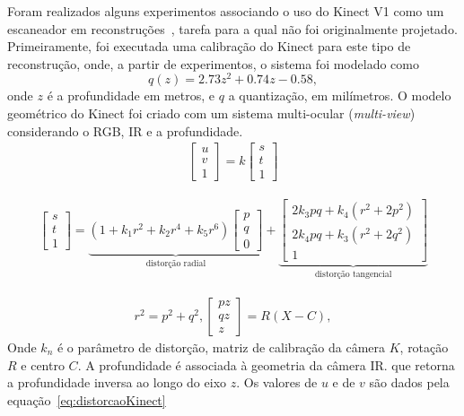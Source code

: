 Foram realizados alguns experimentos associando o uso do Kinect V1 como um
escaneador em reconstruções~\cite{smisek20133d}, tarefa para a qual não foi
originalmente projetado. Primeiramente, foi executada uma calibração do
Kinect para este tipo de reconstrução, onde, a partir de experimentos, o sistema
foi modelado como
\begin{equation}
\label{eq:kinectCalibracao}
q(z)=2.73z^{2}+0.74z-0.58,
\end{equation}
onde $z$ é a profundidade em metros, e $q$ a quantização, em milímetros.
O modelo geométrico do Kinect foi criado com um sistema multi-ocular
(\emph{multi-view}) considerando o RGB, IR e a profundidade.
\begin{gather} 
\label{eq:matrix}
\begin{bmatrix}
u\\
v\\
1
\end{bmatrix} 
= k
\begin{bmatrix}
s\\
t\\
1
\end{bmatrix}
\end{gather}

\begin{gather} 
\begin{bmatrix}
s\\
t\\
1
\end{bmatrix} 
= 
\underbrace{(1 + k_1r^2 + k_2r^4 + k_5r^6) 
\begin{bmatrix}
p\\
q\\
0
\end{bmatrix} }_{\text{distorção radial}} 
+
\underbrace{
\begin{bmatrix}
2k_3pq+k_4(r^2+2p^2)\\
2k_4pq+k_3(r^2+2q^2)\\
1
\end{bmatrix} }_{\text{distorção tangencial}}
\label{eq:distorcaoKinect}
\end{gather}

\begin{gather}
r^2 = p^2+q^2, 
\begin{bmatrix}
pz\\ 
qz\\ 
z
\end{bmatrix} = R(X-C),
\label{eq:relacaoKinect}
\end{gather}
Onde $k_n$ é o parâmetro de distorção, matriz de calibração da câmera $K$, rotação $R$ e centro $C$.
A profundidade é associada à geometria da câmera IR. que retorna a profundidade inversa ao longo do eixo $z$.
Os valores de $u$ e de $v$ são dados pela equação~\ref{eq:distorcaoKinect} %

